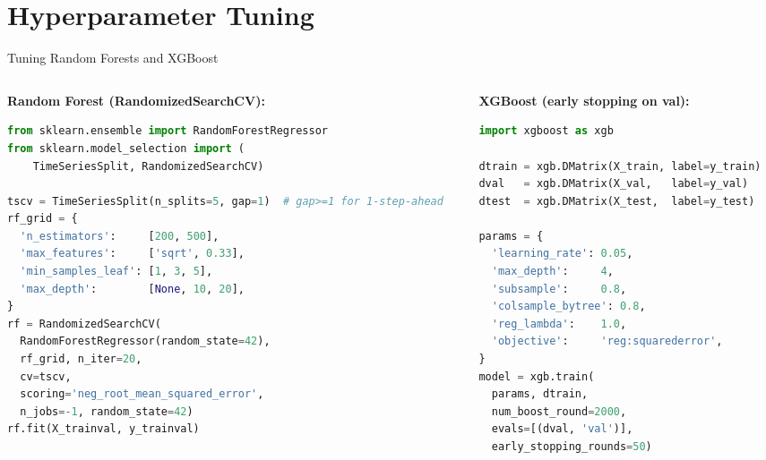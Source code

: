 \documentclass[aspectratio=169, 10pt]{beamer}
\begin{document}
\section{Hyperparameter Tuning}


\begin{frame}[fragile]{Tuning Random Forests and XGBoost}
  \begin{columns}[T]
    \begin{column}{0.48\textwidth}
      \textbf{Random Forest (RandomizedSearchCV):}
\begin{lstlisting}[language=Python, basicstyle=\tiny\ttfamily]
from sklearn.ensemble import RandomForestRegressor
from sklearn.model_selection import (
    TimeSeriesSplit, RandomizedSearchCV)

tscv = TimeSeriesSplit(n_splits=5, gap=1)  # gap>=1 for 1-step-ahead
rf_grid = {
  'n_estimators':     [200, 500],
  'max_features':     ['sqrt', 0.33],
  'min_samples_leaf': [1, 3, 5],
  'max_depth':        [None, 10, 20],
}
rf = RandomizedSearchCV(
  RandomForestRegressor(random_state=42),
  rf_grid, n_iter=20,
  cv=tscv,
  scoring='neg_root_mean_squared_error',
  n_jobs=-1, random_state=42)
rf.fit(X_trainval, y_trainval)
\end{lstlisting}
    \end{column}
    \begin{column}{0.48\textwidth}
      \textbf{XGBoost (early stopping on val):}
\begin{lstlisting}[language=Python, basicstyle=\tiny\ttfamily]
import xgboost as xgb

dtrain = xgb.DMatrix(X_train, label=y_train)
dval   = xgb.DMatrix(X_val,   label=y_val)
dtest  = xgb.DMatrix(X_test,  label=y_test)

params = {
  'learning_rate': 0.05,
  'max_depth':     4,
  'subsample':     0.8,
  'colsample_bytree': 0.8,
  'reg_lambda':    1.0,
  'objective':     'reg:squarederror',
}
model = xgb.train(
  params, dtrain,
  num_boost_round=2000,
  evals=[(dval, 'val')],
  early_stopping_rounds=50)
\end{lstlisting}
    \end{column}
  \end{columns}
\end{frame}
\end{document}
